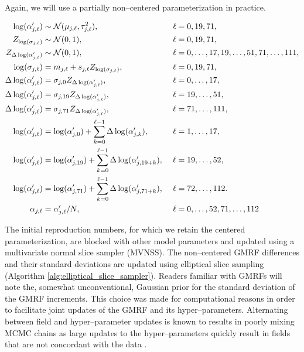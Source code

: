 Again, we will use a partially non--centered parameterization in practice.
\begin{small}
	\begin{align}
	\log(\alpha^\prime_{j,\ell}) &\sim \mcN(\mu_{j,\ell},\tau_{j,\ell}^2),&\ &\ell= 0,19,71, \nonumber\\
	Z_{\log(\sigma_{j,\ell})} &\sim \mcN(0,1),&\ &\ell=0,19,71, \nonumber \\
	Z_{\Delta\log(\alpha^\prime_{j,\ell})} &\sim \mcN(0,1),&\ &\ell=0,\dots,17,19,\dots,51,71,\dots,111, \nonumber \\ 
	\log(\sigma_{j,\ell}) &= m_{j,\ell} + s_{j,\ell}Z_{\log(\sigma_{j,\ell})},&\ &\ell = 0,19,71,\nonumber\\
	\Delta\log(\alpha^\prime_{j,\ell})&= \sigma_{j,0} Z_{\Delta\log(\alpha^\prime_{j,\ell})},&\ &\ell=0,\dots,17, \nonumber\\
	\Delta\log(\alpha^\prime_{j,\ell})&= \sigma_{j,19} Z_{\Delta\log(\alpha^\prime_{j,\ell})},&\ &\ell=19,\dots,51, \nonumber\\
	\Delta\log(\alpha^\prime_{j,\ell})&= \sigma_{j,71} Z_{\Delta\log(\alpha^\prime_{j,\ell})},&\ &\ell=71,\dots,111, \nonumber\\
	\log(\alpha^\prime_{j,\ell}) &= \log(\alpha^\prime_{j,0}) + \sum_{k=0}^{\ell-1}\Delta\log(\alpha^\prime_{j,k}),&\ &\ell = 1,\dots,17, \nonumber\\
	\log(\alpha^\prime_{j,\ell}) &= \log(\alpha^\prime_{j,19}) + \sum_{k=0}^{\ell-1}\Delta\log(\alpha^\prime_{j,19+k}),&\ &\ell = 19,\dots,52, \nonumber\\
	\log(\alpha^\prime_{j,\ell}) &= \log(\alpha^\prime_{j,71}) + \sum_{k=0}^{\ell-1}\Delta\log(\alpha^\prime_{j,71+k}),&\ &\ell = 72,\dots,112. \nonumber \\
	\alpha_{j,\ell} &= \alpha^\prime_{j,\ell}/N,&\ &\ell=0,\dots,52,71,\dots,112 \nonumber
	\end{align}
\end{small}

The initial reproduction numbers, for which we retain the centered parameterization, are blocked with other model parameters and updated using a multivariate normal slice sampler (MVNSS). The non--centered GMRF differences and their standard deviations are updated 
using elliptical slice sampling (Algorithm \ref{alg:elliptical_slice_sampler}).
Readers familiar with GMRFs will note the, somewhat unconventional, Gaussian prior for the standard deviation of the GMRF increments. This choice was made for computational reasons in order to facilitate joint updates of the GMRF and its hyper--parameters. Alternating between field and hyper--parameter updates is known to results in poorly mixing MCMC chains as large updates to the hyper--parameters quickly result in fields that are not concordant with the data  \cite{knorr2002block,murray2010hyper}. 

